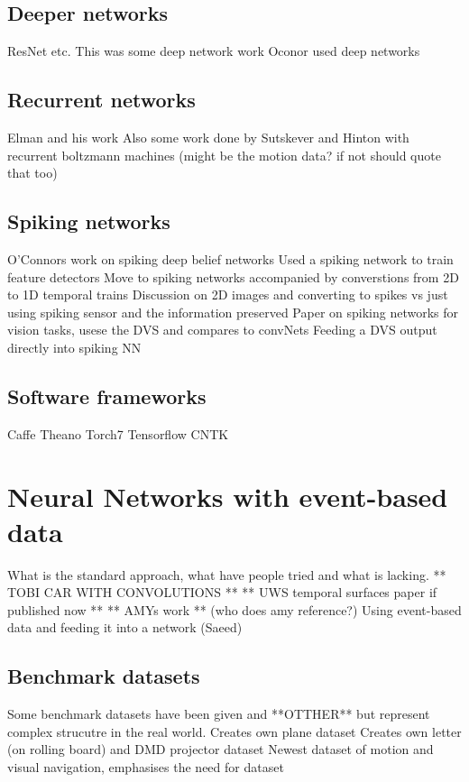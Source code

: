 \subsection{Deeper networks}   %
ResNet etc. %
This was some deep network work \cite{pedroni2013neuromorphic}
Oconor used deep networks \cite{OConnor2013}

\subsection{Recurrent networks}  %
Elman and his work\cite{elman1990}
Also some work done by Sutskever and Hinton with recurrent boltzmann machines (might be the motion data? if not should quote that too)\cite{sutskever2009recurrent}

\subsection{Spiking networks}    %
O'Connors work on spiking deep belief networks \cite{OConnor2013}
Used a spiking network to train feature detectors \cite{afshar2016investigation}
Move to spiking networks accompanied by converstions from 2D to 1D temporal trains \cite{afshar2013ripple}
Discussion on 2D images and converting to spikes vs just using spiking sensor and the information preserved \cite{akolkar2015can}
Paper on spiking networks for vision tasks, usese the DVS and compares to convNets \cite{martin2015spiking}
Feeding a DVS output directly into spiking NN \cite{Bichler}

\subsection{Software frameworks}   %
Caffe\cite{jia2014caffe} Theano Torch7 Tensorflow CNTK

\section{Neural Networks with event-based data}
What is the standard approach, what have people tried and what is lacking. \cite{OConnor2013}  ** TOBI CAR WITH CONVOLUTIONS ** ** UWS temporal surfaces paper if published now ** ** AMYs work ** (who does amy reference?)
Using event-based data and feeding it into a network (Saeed) \cite{afshar2016investigation}

\subsection{Benchmark datasets}
Some benchmark datasets have been given \cite{Gibson2014} and **OTTHER** but represent complex strucutre in the real world.
Creates own plane dataset \cite{afshar2016investigation}
Creates own letter (on rolling board) and DMD projector dataset \cite{akolkar2015can}
Newest dataset of motion and visual navigation, emphasises the need for dataset \cite{barranco2016dataset}

